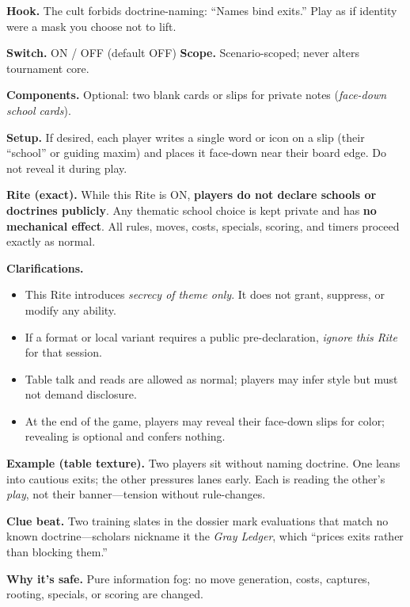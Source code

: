 \documentclass[11pt]{article}
\numberwithin{equation}{section} %
\theoremstyle{plain} %
\theoremstyle{definition} %
\theoremstyle{remark} %
\begin{document}
\noindent\textbf{Hook.} The cult forbids doctrine-naming: “Names bind exits.” Play as if identity were a mask you choose not to lift.

\medskip
\noindent\textbf{Switch.} \textsc{ON / OFF} (default \textsc{OFF}) \hfill \textbf{Scope.} Scenario-scoped; never alters tournament core.

\medskip
\noindent\textbf{Components.} Optional: two blank cards or slips for private notes (\emph{face-down school cards}).

\medskip
\noindent\textbf{Setup.} If desired, each player writes a single word or icon on a slip (their “school” or guiding maxim) and places it face-down near their board edge. Do not reveal it during play.

\medskip
\noindent\textbf{Rite (exact).} While this Rite is \textsc{ON}, \textbf{players do not declare schools or doctrines publicly}. Any thematic school choice is kept private and has \textbf{no mechanical effect}. All rules, moves, costs, specials, scoring, and timers proceed exactly as normal.

\medskip
\noindent\textbf{Clarifications.}
\begin{itemize}\setlength\itemsep{0.25em}
  \item This Rite introduces \emph{secrecy of theme only}. It does not grant, suppress, or modify any ability.
  \item If a format or local variant requires a public pre-declaration, \emph{ignore this Rite} for that session.
  \item Table talk and reads are allowed as normal; players may infer style but must not demand disclosure.
  \item At the end of the game, players may reveal their face-down slips for color; revealing is optional and confers nothing.
\end{itemize}

\medskip
\noindent\textbf{Example (table texture).}  
Two players sit without naming doctrine. One leans into cautious exits; the other pressures lanes early. Each is reading the other’s \emph{play}, not their banner—tension without rule-changes.

\medskip
\noindent\textbf{Clue beat.} Two training slates in the dossier mark evaluations that match no known doctrine—scholars nickname it the \emph{Gray Ledger}, which “prices exits rather than blocking them.”

\medskip
\noindent\textbf{Why it’s safe.} Pure information fog: no move generation, costs, captures, rooting, specials, or scoring are changed.
\end{document}

